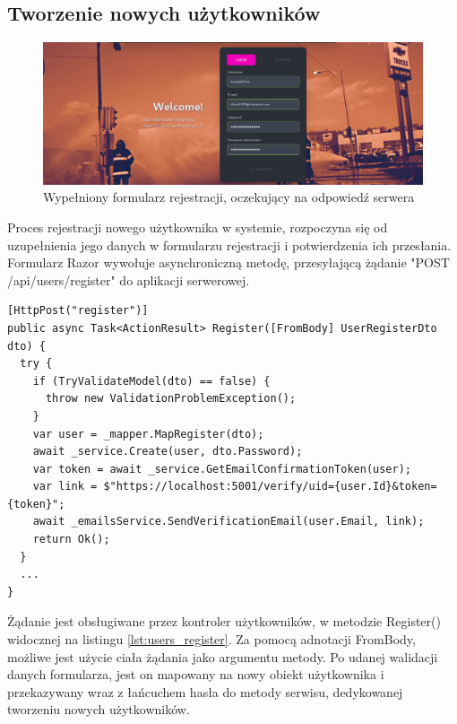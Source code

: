 \subsection{Tworzenie nowych użytkowników}

\begin{figure}[!htbp]
\centering
\includegraphics[width=\textwidth]{img/chapter5/registration.png}
\caption{Wypełniony formularz rejestracji, oczekujący na odpowiedź serwera}
\end{figure}

Proces rejestracji nowego użytkownika w systemie, rozpoczyna się od uzupełnienia jego danych w formularzu rejestracji i potwierdzenia ich przesłania. Formularz Razor wywołuje asynchroniczną metodę, przesyłającą żądanie "POST /api/users/register" do aplikacji serwerowej.

\begin{lstlisting}[language=CSharp, caption={Metoda kontrolera użytkowników odpowiedzialna za rejestrację nowego użytkownika w systemie}, label=lst:users_register]
[HttpPost("register")]
public async Task<ActionResult> Register([FromBody] UserRegisterDto dto) {
  try {
    if (TryValidateModel(dto) == false) {
      throw new ValidationProblemException();
    }
    var user = _mapper.MapRegister(dto);
    await _service.Create(user, dto.Password);
    var token = await _service.GetEmailConfirmationToken(user);
    var link = $"https://localhost:5001/verify/uid={user.Id}&token={token}";
    await _emailsService.SendVerificationEmail(user.Email, link);
    return Ok();
  }
  ...
}
\end{lstlisting}

Żądanie jest obsługiwane przez kontroler użytkowników, w metodzie Register() widocznej na listingu \ref{lst:users_register}. Za pomocą adnotacji FromBody, możliwe jest użycie ciała żądania jako argumentu metody. Po udanej walidacji danych formularza, jest on mapowany na nowy obiekt użytkownika i przekazywany wraz z łańcuchem hasła do metody serwisu, dedykowanej tworzeniu nowych użytkowników.


